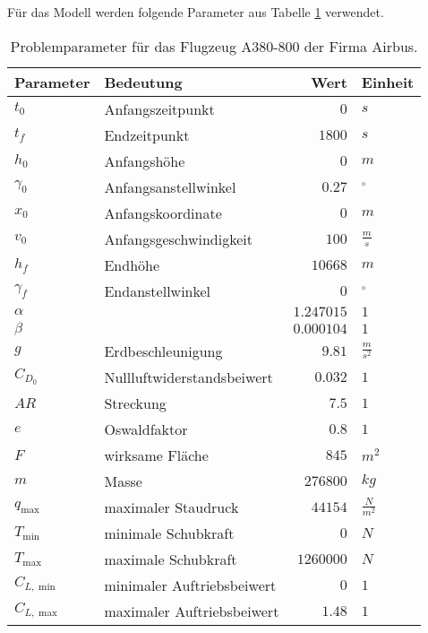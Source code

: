 Für das Modell werden folgende Parameter aus Tabelle \ref{tab:ProblemPara} verwendet.
\begin{table}[H]
    \centering
    \caption{Problemparameter für das Flugzeug A380-800 der Firma Airbus.}\label{tab:ProblemPara}
    \begin{tabularx}{.9\textwidth}{lXrl}
        \toprule
        \textbf{Parameter}   & \textbf{Bedeutung} & \textbf{Wert} & \textbf{Einheit} \\ 
        \midrule
        $t_0$       & Anfangszeitpunkt & $0$ & $s$ \\ 
        $t_f$       & Endzeitpunkt & $1800$ & $s$ \\ 
        \hline
        $h_0$       & Anfangshöhe & $0$ & $m$ \\ 
        $\gamma_0$  & Anfangsanstellwinkel & $0.27$ & $^{\circ}$ \\
        $x_0$       & Anfangskoordinate & $0$ & $m$ \\ 
        $v_0$       & Anfangsgeschwindigkeit & $100$ & $\frac{m}{s}$ \\ 
        \hline
        $h_f$       & Endhöhe & $10668$ & $m$ \\ 
        $\gamma_f$  & Endanstellwinkel & $0$ & $^{\circ}$ \\
        \hline
        $\alpha$    &  & $1.247015$ & $1$\\ 
        $\beta$     &  & $0.000104$ & $1$\\
        $g$         & Erdbeschleunigung & $9.81$ & $\frac{m}{s^2}$ \\ 
        $C_{D_0}$   & Nullluftwiderstandsbeiwert & $0.032$ & $1$\\ 
        $AR$        & Streckung & $7.5$ & $1$\\ 
        $e$         & Oswaldfaktor & $0.8$ & $1$\\ 
        $F$         & wirksame Fläche & $845$ & $m^2$ \\ 
        $m$         & Masse & $276800$ & $kg$ \\ 
        $q_{\max}$  & maximaler Staudruck & $44154$ & $\frac{N}{m^2}$ \\
        $T_{\min}$  & minimale Schubkraft & $0$ & $N$ \\  
        $T_{\max}$  & maximale Schubkraft & $1260000$ & $N$ \\ 
        $C_{L, \min}$ & minimaler Auftriebsbeiwert & $0$ & $1$ \\ 
        $C_{L, \max}$ & maximaler Auftriebsbeiwert & $1.48$ & $1$ \\ 
        \bottomrule
    \end{tabularx} 
\end{table}


